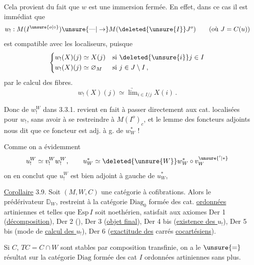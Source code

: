 Cela provient du fait que $w$ est une
immersion fermée. En effet, dans ce
cas il est immédiat que 
\[
w_!:M(I^{\unsure{o|\circ}})\unsure{\text{---}|\to} M(\deleted{\unsure{I}}J^o)\qquad(\text{où }J=C(u))
\]
est compatible avec les localiseurs,
puisque  
\[
\left\{\begin{aligned}
 w_!(X)(j)&\simeq X(j) &&\text{si }\deleted{\unsure{i}}j\in I\\
 w_!(X)(j)&\simeq\varnothing_M &&\text{si }j\in J\setminus I\,,
\end{aligned}\right.
\]
par le calcul des fibres.
\[
w_!(X)(j)\simeq\underrightarrow{\lim}_{i\in I/j}X(i)\,.
\]

Donc   de $w_!^W$  dans
3.3.1. revient en fait à passer directement
aux cat. localisées pour $w_!$, sans avoir
à se restreindre à $M(I^o)_c$, et le
lemme des foncteurs adjoints nous dit que
ce foncteur est adj. à g. de $w_W^*$ !

Comme on a évidemment
\[
u_!^W\simeq v_!^W w_!^W,\qquad u_W^*\simeq \deleted{\unsure{W}}w_W^*\circ v_W^{\unsure{'|*}}
\]
on en conclut que $u_!^W$ est bien adjoint
à gauche de $u_W^*$, 

\uline{Corollaire} 3.9. Soit $(M,W,C)$ une catégorie
à cofibrations. Alors le prédérivateur
$\mathbb{D}_W$,  restreint à la catégorie 
$\mathrm{Diag}_0$ formée des cat.  \uline{ordonnées} 
artiniennes et telles que $\mathrm{Esp}\,I$
soit noethérien, satisfait aux
axiomes Der 1 (\uline{décomposition}), Der 2
(\uline{}), Der 3 (\uline{objet final}),
Der 4 bis (\uline{existence des $u_!$}), Der 5 bis
(mode de \uline{calcul des $u_!$}), Der 6
(\uline{exactitude des} carrés \uline{cocartésiens}).

Si $C$, $TC=C\cap W$ sont stables par composition
transfinie, on a le $\unsure{=}$ résultat
sur la catégorie $\mathrm{Diag}$ formée des
cat $I$ ordonnées artiniennes sans plus.

